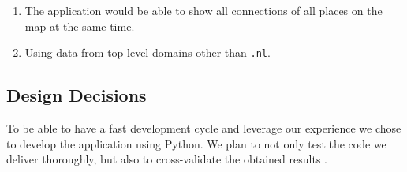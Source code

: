 \begin{enumerate}
    \item The application would be able to show all connections of all places on the map at the same time.
    \item Using data from top-level domains other than \texttt{.nl}.
\end{enumerate}

\subsection{Design Decisions}
To be able to have a fast development cycle and leverage our experience we chose to develop the application using Python. 
 We plan to not only test the code we deliver thoroughly, but also to cross-validate the obtained results .
